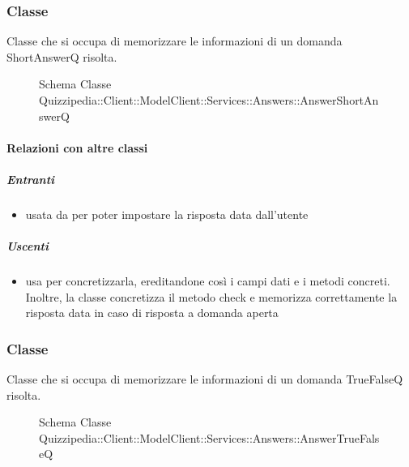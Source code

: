 \subsubsection{Classe }
Classe che si occupa di memorizzare le informazioni di un domanda ShortAnswerQ risolta.
\begin{figure}[H]
\centering
\noindent{}
\caption[Schema Classe AnswerShortAnswerQ]{Schema Classe Quizzipedia::Client::ModelClient::Services::Answers::AnswerShortAnswerQ}
\end{figure}
\paragraph{Relazioni con altre classi}
\subparagraph{Entranti}
\begin{itemize}
\item usata da  per poter impostare la risposta data dall'utente
\end{itemize}
\subparagraph{Uscenti}
\begin{itemize}
\item usa  per concretizzarla, ereditandone così i campi dati e i metodi concreti. Inoltre, la classe concretizza il metodo check e memorizza correttamente la risposta data in caso di risposta a domanda aperta
\end{itemize}
\subsubsection{Classe }
Classe che si occupa di memorizzare le informazioni di un domanda TrueFalseQ risolta.
\begin{figure}[H]
\centering
\noindent{}
\caption[Schema Classe AnswerTrueFalseQ]{Schema Classe Quizzipedia::Client::ModelClient::Services::Answers::AnswerTrueFalseQ}
\end{figure}
